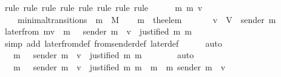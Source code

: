 \begin{isabellebody}
%
\isatagproof
{}\isamarkupfalse%
\ {\isacharparenleft}rule{\isacharcomma}\ rule{\isacharcomma}\ rule{\isacharcomma}\ rule{\isacharcomma}\ rule{\isacharcomma}\ rule{\isacharcomma}\ rule{\isacharcomma}\ rule{\isacharparenright}\isanewline
{}\isamarkupfalse%
{\isacharminus}\isanewline
\ \ \isamarkupfalse%
\ {\isasymsigma}\ {\isasymsigma}{\isacharprime}\ m\ m{\isacharprime}\ v\isanewline
\ \ \isamarkupfalse%
\ {\isachardoublequoteopen}{\isacharparenleft}{\isasymsigma}{\isacharcomma}\ {\isasymsigma}{\isacharprime}{\isacharparenright}\ {\isasymin}\ minimal{\isacharunderscore}transitions\ {\isasymand}\ m\ {\isasymin}\ M{\isachardoublequoteclose}\isanewline
\ \ \isamarkupfalse%
\ {\isachardoublequoteopen}m{\isacharprime}\ {\isacharequal}\ the{\isacharunderscore}elem\ {\isacharparenleft}{\isasymsigma}{\isacharprime}\ {\isacharminus}\ {\isasymsigma}{\isacharparenright}{\isachardoublequoteclose}\isanewline
\ \ \isamarkupfalse%
\ {\isachardoublequoteopen}v\ {\isasymin}\ V\ {\isacharminus}\ {\isacharbraceleft}sender\ m{\isacharprime}{\isacharbraceright}{\isachardoublequoteclose}\isanewline
\isanewline
\ \ \isamarkupfalse%
\ {\isachardoublequoteopen}later{\isacharunderscore}from\ {\isacharparenleft}m{\isacharcomma}v{\isacharcomma}{\isasymsigma}{\isacharparenright}\ {\isacharequal}\ {\isacharbraceleft}m{\isacharprime}{\isacharprime}\ {\isasymin}\ {\isasymsigma}{\isachardot}\ sender\ m{\isacharprime}{\isacharprime}\ {\isacharequal}\ v\ {\isasymand}\ justified\ m\ m{\isacharprime}{\isacharprime}{\isacharbraceright}{\isachardoublequoteclose}\isanewline
\ \ \ \ \isamarkupfalse%
\ {\isacharparenleft}simp\ add{\isacharcolon}\ later{\isacharunderscore}from{\isacharunderscore}def\ from{\isacharunderscore}sender{\isacharunderscore}def\ later{\isacharunderscore}def{\isacharparenright}\isanewline
\ \ \ \ \isamarkupfalse%
\ auto\isanewline
\ \ \isamarkupfalse%
\ \isamarkupfalse%
\ {\isachardoublequoteopen}{\isasymdots}\ {\isacharequal}\ {\isacharbraceleft}m{\isacharprime}{\isacharprime}\ {\isasymin}\ {\isasymsigma}{\isachardot}\ sender\ m{\isacharprime}{\isacharprime}\ {\isacharequal}\ v\ {\isasymand}\ justified\ m\ m{\isacharprime}{\isacharprime}{\isacharbraceright}\ {\isasymunion}\ {\isasymemptyset}{\isachardoublequoteclose}\isanewline
\ \ \ \ \isamarkupfalse%
\ auto\ \ \ \ \isanewline
\ \ \isamarkupfalse%
\ \isamarkupfalse%
\ {\isachardoublequoteopen}{\isasymdots}\ {\isacharequal}\ {\isacharbraceleft}m{\isacharprime}{\isacharprime}\ {\isasymin}\ {\isasymsigma}{\isachardot}\ sender\ m{\isacharprime}{\isacharprime}\ {\isacharequal}\ v\ {\isasymand}\ justified\ m\ m{\isacharprime}{\isacharprime}{\isacharbraceright}\ {\isasymunion}\ {\isacharbraceleft}m{\isacharprime}{\isacharprime}\ {\isasymin}\ {\isacharbraceleft}m{\isacharprime}{\isacharbraceright}{\isachardot}\ sender\ m{\isacharprime}{\isacharprime}\ {\isacharequal}\ v{\isacharbraceright}{\isachardoublequoteclose}\isanewline

\end{isabellebody}
